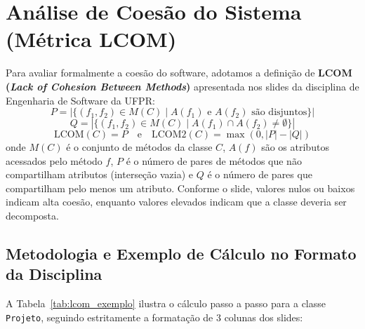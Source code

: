 \documentclass[12pt]{article}
\begin{document}
\section{Análise de Coesão do Sistema (Métrica LCOM)}

Para avaliar formalmente a coesão do software, adotamos a definição de \textbf{LCOM (\textit{Lack of Cohesion Between Methods})} apresentada nos slides da disciplina de Engenharia de Software da UFPR:
\begin{equation}
P = | \{ (f_1, f_2) \in M(C) \mid A(f_1) \text{ e } A(f_2) \text{ são disjuntos} \} |
\end{equation}
\begin{equation}
Q = | \{ (f_1, f_2) \in M(C) \mid A(f_1) \cap A(f_2) \neq \emptyset \} |
\end{equation}
\begin{equation}
\text{LCOM}(C) = P \quad \text{e} \quad \text{LCOM2}(C) = \max(0, |P| - |Q|)
\end{equation}
onde $M(C)$ é o conjunto de métodos da classe $C$, $A(f)$ são os atributos acessados pelo método $f$, $P$ é o número de pares de métodos que não compartilham atributos (interseção vazia) e $Q$ é o número de pares que compartilham pelo menos um atributo. Conforme o slide, valores nulos ou baixos indicam alta coesão, enquanto valores elevados indicam que a classe deveria ser decomposta.

\subsection{Metodologia e Exemplo de Cálculo no Formato da Disciplina}

A Tabela~\ref{tab:lcom_exemplo} ilustra o cálculo passo a passo para a classe \texttt{Projeto}, seguindo estritamente a formatação de 3 colunas dos slides:
\end{document}
